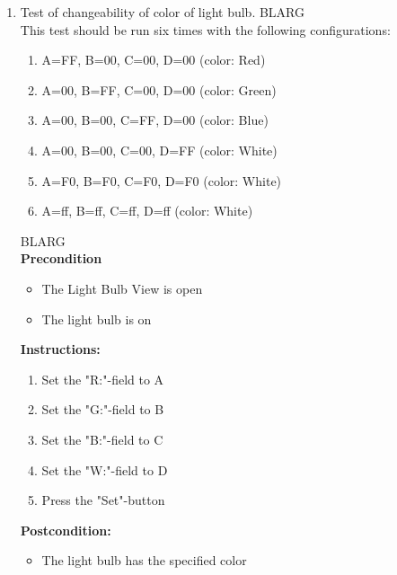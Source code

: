 \documentclass[a4paper]{article}
\newlength{\testlabellength}
\newenvironment{testlist}{\begin{enumerate}[label=\bfseries Instruction \thesubsection.\arabic* , labelindent=0pt, labelwidth=\testlabellength , leftmargin=2cm]}{\end{enumerate}}
\newenvironment{config}[1][2]{
{\color{white}BLARG}\\ 
This test should be run #1 times with the following configurations:
\begin{enumerate}[label=\bfseries  \arabic*., labelindent=0cm, labelwidth=2cm , leftmargin=1cm]
}
{\end{enumerate}}
\newenvironment{precondition}{
{\color{white}BLARG}\\ 
\textbf{Precondition}
\begin{itemize}[labelindent=0cm, labelwidth=2cm , leftmargin=1cm]
}
{\end{itemize}}
\newenvironment{instruction}{
\textbf{Instructions:}
\begin{enumerate}[label=\bfseries  \arabic*., labelindent=0cm, labelwidth=2cm , leftmargin=1cm]
}
{\end{enumerate}}
\newenvironment{postcondition}{
\textbf{Postcondition:}
\begin{itemize}[labelindent=0cm, labelwidth=2cm , leftmargin=1cm]
}
{\end{itemize}}
\begin{document}
\begin{appendices}
\begin{testlist}
\newpage

	\item Test of changeability of color of light bulb.
		\begin{config}[six]
			\item A=FF, B=00, C=00, D=00 (color: Red)
			\item A=00, B=FF, C=00, D=00 (color: Green)
			\item A=00, B=00, C=FF, D=00 (color: Blue)
			\item A=00, B=00, C=00, D=FF (color: White)
			\item A=F0, B=F0, C=F0, D=F0 (color: White)
			\item A=ff, B=ff, C=ff, D=ff (color: White)
		\end{config}
		\begin{precondition}
			\item The Light Bulb View is open
			\item The light bulb is on
		\end{precondition}
		\begin{instruction}
			\item Set the "R:"-field to A
			\item Set the "G:"-field to B
			\item Set the "B:"-field to C
			\item Set the "W:"-field to D
			\item Press the "Set"-button
		\end{instruction}
		\begin{postcondition}
			\item The light bulb has the specified color
		\end{postcondition}
		


\end{testlist}
\end{appendices}
\end{document}
